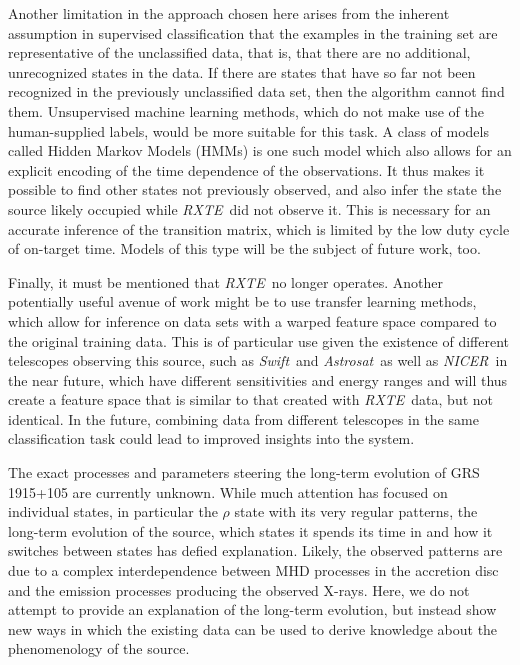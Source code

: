 \documentclass[fleqn,usenatbib]{mnras}
\newcommand{\project}[1]{\textsl{#1}}
\newcommand{\rxte}{\project{RXTE}}
\newcommand{\swift}{\project{Swift}}
\newcommand{\astrosat}{\project{Astrosat}}
\newcommand{\nicer}{\project{NICER}}
\begin{document}
Another limitation in the approach chosen here arises from the inherent assumption in supervised classification that the examples in the training set are representative 
of the unclassified data, that is, that there are no additional, unrecognized states in the data. If there are states that have so far not been 
recognized in the previously unclassified data set, then the algorithm cannot find them. Unsupervised machine learning methods, which do not make 
use of the human-supplied labels, would be more suitable for this task. A class of models called Hidden Markov Models (HMMs) is one such model which also 
allows for an explicit encoding of the time dependence of the observations. It thus makes it possible to find other states not previously observed, and also infer 
the state the source likely occupied while \rxte\ did not observe it. This is necessary for an accurate inference of the transition matrix, which is limited by the 
low duty cycle of on-target time. Models of this type will be the subject of future work, too.

Finally, it must be mentioned that \rxte\ no longer operates. Another potentially useful avenue of work might be to use transfer learning methods, which allow 
for inference on data sets with a warped feature space compared to the original training data. This is of particular use given the existence of different telescopes 
observing this source, such as \swift\ and \astrosat\, as well as \nicer\ in the near future, which have different sensitivities and energy ranges and will thus create 
a feature space that is similar to that created with \rxte\ data, but not identical. In the future, combining data from different telescopes in the same classification task
could lead to improved insights into the system.

The exact processes and parameters steering the long-term evolution of GRS 1915+105 are currently unknown. While much attention has focused on 
individual states, in particular the $\rho$ state with its very regular patterns, the long-term evolution of the source, which states it spends its time in and how 
it switches between states has defied explanation. Likely, the observed patterns are due to a complex interdependence between MHD processes in the accretion 
disc and the emission processes producing the observed X-rays. Here, we do not attempt to provide an explanation of the long-term evolution, but instead show 
new ways in which the existing data can be used to derive knowledge about the phenomenology of the source.
\end{document}
